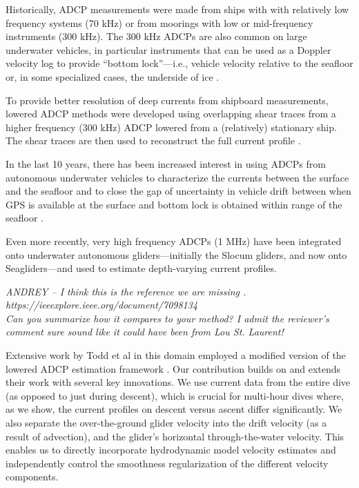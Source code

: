 Historically, ADCP measurements were made from ships with with relatively low frequency systems (70 kHz) or from moorings with low or mid-frequency instruments (300 kHz). The 300 kHz ADCPs are also common on large underwater vehicles, in particular instruments that can be used as a Doppler velocity log to provide ``bottom lock''---i.e., vehicle velocity relative to the seafloor \cite{yoerger-1998-ABE} or, in some specialized cases, the underside of ice \cite{mcfarland-2015-icerelnav}.

To provide better resolution of deep currents from shipboard measurements, lowered ADCP methods were developed using overlapping shear traces from a higher frequency (300 kHz) ADCP lowered from a (relatively) stationary ship. The shear traces are then used to reconstruct the full current profile \cite{Visbeck2002}.

In the last 10 years, there has been increased interest in using ADCPs from autonomous underwater vehicles to characterize the currents between the surface and the seafloor and to close the gap of uncertainty in vehicle drift between when GPS is available at the surface and bottom lock is obtained within range of the seafloor \cite{mstanway-2010a,medagoda10_oceans}.

Even more recently, very high frequency ADCPs (1 MHz) have been integrated onto underwater autonomous gliders---initially the Slocum gliders, and now onto Seagliders---and used to estimate depth-varying current profiles. 

\emph{ANDREY -- I think this is the reference we are missing \cite{thurnherr-2015-slocum-adcp}. \\
https://ieeexplore.ieee.org/document/7098134 \\
Can you summarize how it compares to your method? I admit the reviewer's comment sure sound like it could have been from Lou St. Laurent!}

Extensive work by Todd et al in this domain employed a modified version of the lowered ADCP estimation framework \cite{todd-2011-JGRC,todd-2017-JAOT}.
%
Our contribution builds on and extends their work with several key innovations. We use current data from the entire dive (as opposed to just during descent), which is crucial for multi-hour dives where, as we show, the current profiles on descent versus ascent differ significantly. We also separate the over-the-ground glider velocity into the drift velocity (as a result of advection), and the glider's horizontal through-the-water velocity. This enables us to directly incorporate hydrodynamic model velocity estimates and independently control the smoothness regularization of the different velocity components.